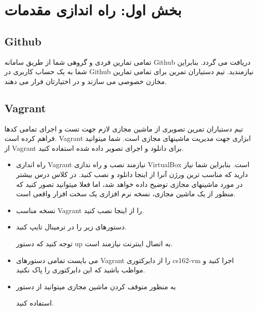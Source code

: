 \newpage
\section
{
\textbf{ {\Large 
بخش اول: راه اندازی مقدمات
}}}

\subsection{Github}
تمامی تمارین فردی و گروهی شما از طریق سامانه Github دریافت می گردد. بنابراین شما به یک حساب کاربری در Github نیازمندید.
تیم دستیاران تمرین برای تمامی تمارین مخازن خصوصی می سازند و در اختیارتان فرار می دهند.

\subsection{Vagrant}
تیم دستیاران تمرین تصویری
از ماشین مجازی لازم جهت تست و اجرای تمامی کدها فراهم کرده است. Vagrant ابزاری جهت مدیریت ماشینهای مجازی است. شما میتوانید 
از Vagrant  برای دانلود و اجرای تصویر داده شده استفاده کنید.



\begin{itemize}
\item
راه اندازی Vagrant نیازمند نصب و راه ندازی VirtualBox است. بنابراین شما نیاز دارید که مناسب ترین ورژن آنرا از اینجا دانلود و نصب کنید.
در کلاس درس بیشتر در مورد ماشینهای مجازی توضیح داده خواهد شد، اما فعلا میتوانید تصور کنید که منظور از یک ماشین مجازی، نسخه نرم افزاری یک سخت افزار واقعی است.
\item
نسخه مناسب Vagrant را از اینجا نصب کنید. 
\item
دستورهای زیر را در ترمینال تایپ کنید.
\begin{flushleft}
\end{flushleft}
توجه کنید که دستور up به اتصال اینترنت نیازمند است.
\item
می بایست تمامی دستورهای Vagrant را از دایرکتوری cs162-vm اجرا کنید و مواظب باشید که این دایرکتوری را پاک نکنید.
\item
به منظور متوقف کردن ماشین مجازی میتوانید از دستور \begin{flushleft}
\end{flushleft} استفاده کنید.
\end{itemize}

